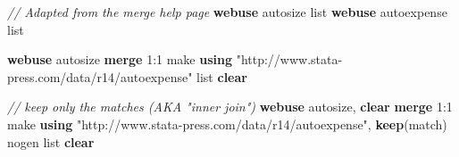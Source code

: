 \documentclass[]{book}
\newenvironment{Shaded}{\begin{snugshade}}{\end{snugshade}}
\newcommand{\CommentTok}[1]{\textcolor[rgb]{0.56,0.35,0.01}{\textit{#1}}}
\newcommand{\FunctionTok}[1]{\textcolor[rgb]{0.00,0.00,0.00}{#1}}
\newcommand{\KeywordTok}[1]{\textcolor[rgb]{0.13,0.29,0.53}{\textbf{#1}}}
\newcommand{\NormalTok}[1]{#1}
\newcommand{\OtherTok}[1]{\textcolor[rgb]{0.56,0.35,0.01}{#1}}
\newcommand{\StringTok}[1]{\textcolor[rgb]{0.31,0.60,0.02}{#1}}
\begin{document}
\begin{Shaded}
\begin{Highlighting}[]
  \CommentTok{// Adapted from the merge help page}
  \KeywordTok{webuse}\NormalTok{ autosize }
  \OtherTok{list}
  \KeywordTok{webuse}\NormalTok{ autoexpense}
  \OtherTok{list}

  \KeywordTok{webuse}\NormalTok{ autosize}
  \KeywordTok{merge}\NormalTok{ 1:1 make }\KeywordTok{using} \StringTok{"http://www.stata-press.com/data/r14/autoexpense"}
  \OtherTok{list}
  \KeywordTok{clear}

  \CommentTok{// keep only the matches (AKA "inner join")}
  \KeywordTok{webuse}\NormalTok{ autosize, }\KeywordTok{clear}
  \KeywordTok{merge}\NormalTok{ 1:1 make }\KeywordTok{using} \StringTok{"http://www.stata-press.com/data/r14/autoexpense"}\NormalTok{, }\KeywordTok{keep}\NormalTok{(}\FunctionTok{match}\NormalTok{) nogen}
  \OtherTok{list}
  \KeywordTok{clear}
\end{Highlighting}
\end{Shaded}
\end{document}
